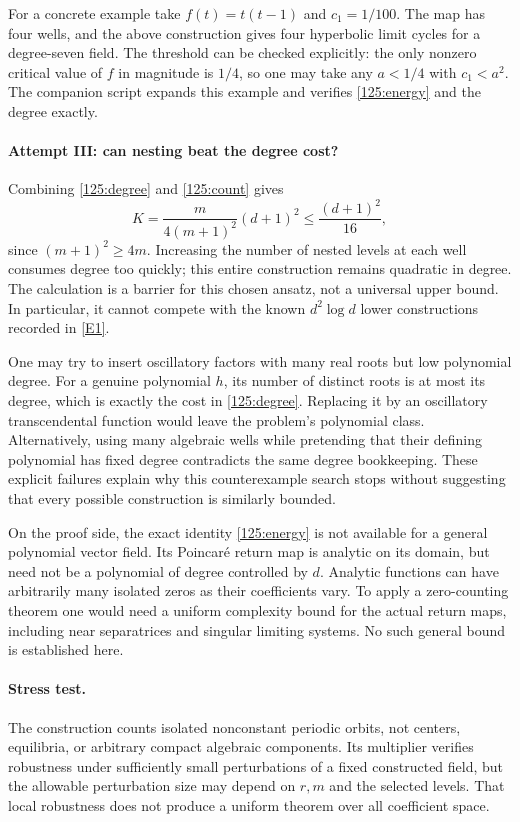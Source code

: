 \documentclass[11pt,a4paper]{article}
\newcommand{\eref}[2]{\hyperlink{extra:#1:#2}{[E#2]}}
\numberwithin{equation}{section}
\begin{document}
For a concrete example take $f(t)=t(t-1)$ and $c_1=1/100$.
The map has four wells, and the above construction gives four hyperbolic
limit cycles for a degree-seven field.  The threshold can be checked
explicitly: the only nonzero critical value of $f$ in magnitude is
$1/4$, so one may take any $a<1/4$ with $c_1<a^2$.
The companion script expands this example and verifies
\eqref{125:energy} and the degree exactly.

\paragraph{Attempt III: can nesting beat the degree cost?}
Combining \eqref{125:degree} and \eqref{125:count} gives
\[
 K=\frac{m}{4(m+1)^2}(d+1)^2
       \leq\frac{(d+1)^2}{16},
\]
since $(m+1)^2\geq4m$.  Increasing the number of nested levels at each
well consumes degree too quickly; this entire construction remains
quadratic in degree.  The calculation is a barrier for this chosen
ansatz, not a universal upper bound.  In particular, it cannot compete
with the known $d^2\log d$ lower constructions recorded in
\eref{125}{1}.

One may try to insert oscillatory factors with many real roots but low
polynomial degree.  For a genuine polynomial $h$, its number of distinct
roots is at most its degree, which is exactly the cost in
\eqref{125:degree}.  Replacing it by an oscillatory transcendental
function would leave the problem's polynomial class.  Alternatively,
using many algebraic wells while pretending that their defining
polynomial has fixed degree contradicts the same degree bookkeeping.
These explicit failures explain why this counterexample search stops
without suggesting that every possible construction is similarly bounded.

On the proof side, the exact identity \eqref{125:energy} is not available
for a general polynomial vector field.  Its Poincar\'e return map is
analytic on its domain, but need not be a polynomial of degree controlled
by $d$.  Analytic functions can have arbitrarily many isolated zeros as
their coefficients vary.  To apply a zero-counting theorem one would
need a uniform complexity bound for the actual return maps, including
near separatrices and singular limiting systems.  No such general bound
is established here.

\paragraph{Stress test.}
The construction counts isolated nonconstant periodic orbits, not
centers, equilibria, or arbitrary compact algebraic components.  Its
multiplier verifies robustness under sufficiently small perturbations
of a fixed constructed field, but the allowable perturbation size may
depend on $r,m$ and the selected levels.  That local robustness does not
produce a uniform theorem over all coefficient space.
\end{document}
